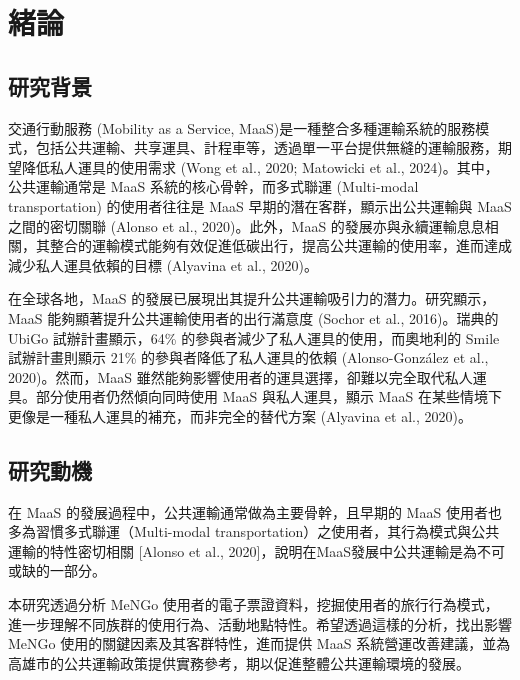
\providecommand{\tightlist}{%
  \setlength{\itemsep}{0pt}\setlength{\parskip}{0pt}
}

\chapter{緒論}\label{ux7dd2ux8ad6}

\section{研究背景}\label{ux7814ux7a76ux80ccux666f}

交通行動服務 (Mobility as a Service,
MaaS)是一種整合多種運輸系統的服務模式，包括公共運輸、共享運具、計程車等，透過單一平台提供無縫的運輸服務，期望降低私人運具的使用需求
(Wong et al., 2020; Matowicki et al., 2024)。其中，公共運輸通常是 MaaS
系統的核心骨幹，而多式聯運 (Multi-modal transportation) 的使用者往往是
MaaS 早期的潛在客群，顯示出公共運輸與 MaaS 之間的密切關聯 (Alonso et
al., 2020)。此外，MaaS
的發展亦與永續運輸息息相關，其整合的運輸模式能夠有效促進低碳出行，提高公共運輸的使用率，進而達成減少私人運具依賴的目標
(Alyavina et al., 2020)。

在全球各地，MaaS
的發展已展現出其提升公共運輸吸引力的潛力。研究顯示，MaaS
能夠顯著提升公共運輸使用者的出行滿意度 (Sochor et al., 2016)。瑞典的
UbiGo 試辦計畫顯示，64\% 的參與者減少了私人運具的使用，而奧地利的 Smile
試辦計畫則顯示 21\% 的參與者降低了私人運具的依賴 (Alonso-González et
al., 2020)。然而，MaaS
雖然能夠影響使用者的運具選擇，卻難以完全取代私人運具。部分使用者仍然傾向同時使用
MaaS 與私人運具，顯示 MaaS
在某些情境下更像是一種私人運具的補充，而非完全的替代方案 (Alyavina et
al., 2020)。

\section{研究動機}\label{ux7814ux7a76ux52d5ux6a5f}

在 MaaS 的發展過程中，公共運輸通常做為主要骨幹，且早期的 MaaS
使用者也多為習慣多式聯運（Multi-modal
transportation）之使用者，其行為模式與公共運輸的特性密切相關 {[}Alonso
et al., 2020{]}，說明在MaaS發展中公共運輸是為不可或缺的一部分。

本研究透過分析 MeNGo
使用者的電子票證資料，挖掘使用者的旅行行為模式，進一步理解不同族群的使用行為、活動地點特性。希望透過這樣的分析，找出影響
MeNGo 使用的關鍵因素及其客群特性，進而提供 MaaS
系統營運改善建議，並為高雄市的公共運輸政策提供實務參考，期以促進整體公共運輸環境的發展。

